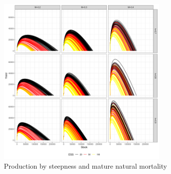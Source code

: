 \begin{figure}[ht!]\centering\includegraphics[width=0.75\textwidth]{figures/pf-grid-1.png} 
\caption{Production by steepness and mature natural mortality}
\label{fig:pf}       
\end{figure}

